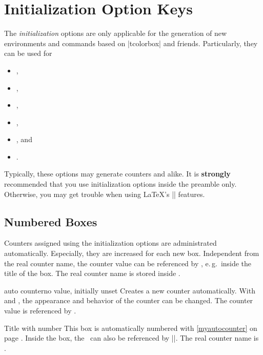 \clearpage
\section{Initialization Option Keys}\label{sec:initkeys}%
%
The \emph{initialization} options are only applicable for the generation
of new environments and commands based on |tcolorbox| and friends.
Particularly, they can be used for
\begin{itemize}
\item{},
\item{},
\item{},
\item{},
\item{}, and
\item{}.
\end{itemize}

\bigskip
\begin{marker}
Typically, these options may generate counters and alike.
It is \textbf{strongly} recommended that you use initialization options inside
the preamble only. Otherwise, you may get trouble when using \LaTeX's || features.
\end{marker}


\subsection{Numbered Boxes}\label{sec:numberedboxes}
Counters assigned using the initialization options are administrated
automatically. Especially, they are increased for each new box.
Independent from the real counter name, the counter value can be
referenced by , e.\,g.\ inside the title of
the box. The real counter name is stored inside .

\begin{newTcbKey}{auto counter}{}{no value, initially unset}
Creates a new counter automatically.
With  and
, the appearance and behavior of the counter
can be changed. The counter value is referenced by .


\begin{dispExample}
\begin{pabox}[label={myautocounter}]{Title with number}
This box is automatically numbered with \ref{myautocounter} on page
\pageref{myautocounter}. Inside the box, the \thetcbcounter\ can
also be referenced by |\thetcbcounter|.
The real counter name is \texttt{\tcbcounter}.
\end{pabox}
\end{dispExample}
\end{newTcbKey}

